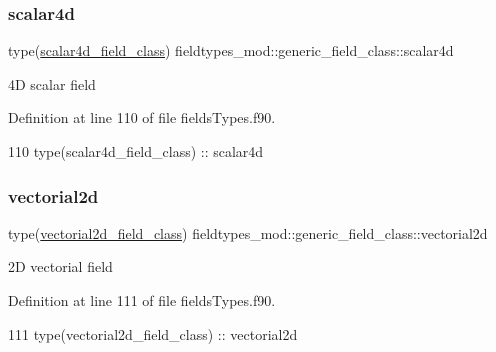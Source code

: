 \subsubsection{\texorpdfstring{scalar4d}{scalar4d}}
{\footnotesize\ttfamily type(\mbox{\hyperlink{structfieldtypes__mod_1_1scalar4d__field__class}{scalar4d\+\_\+field\+\_\+class}}) fieldtypes\+\_\+mod\+::generic\+\_\+field\+\_\+class\+::scalar4d\hspace{0.3cm}{\ttfamily [private]}}



4D scalar field 



Definition at line 110 of file fields\+Types.\+f90.


\begin{DoxyCode}
110         \textcolor{keywordtype}{type}(scalar4d\_field\_class) :: scalar4d
\end{DoxyCode}
\mbox{\label{structfieldtypes__mod_1_1generic__field__class_a8c04c463fb823576ae29de240eb209f5}} 
\subsubsection{\texorpdfstring{vectorial2d}{vectorial2d}}
{\footnotesize\ttfamily type(\mbox{\hyperlink{structfieldtypes__mod_1_1vectorial2d__field__class}{vectorial2d\+\_\+field\+\_\+class}}) fieldtypes\+\_\+mod\+::generic\+\_\+field\+\_\+class\+::vectorial2d\hspace{0.3cm}{\ttfamily [private]}}



2D vectorial field 



Definition at line 111 of file fields\+Types.\+f90.


\begin{DoxyCode}
111         \textcolor{keywordtype}{type}(vectorial2d\_field\_class) :: vectorial2d
\end{DoxyCode}
\mbox{\label{structfieldtypes__mod_1_1generic__field__class_aff0ebfb0a2e374714172bd0e7202f036}} 
